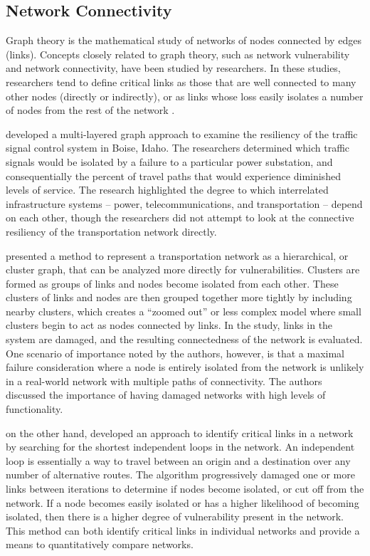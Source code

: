 \subsection{Network Connectivity}

Graph theory is the mathematical study of networks of nodes connected by
edges (links). Concepts closely related to graph theory, such as network
vulnerability and network connectivity, have been studied by researchers.
In these studies, researchers tend to define
critical links as those
that are well connected to many other nodes (directly or indirectly), or as links
whose loss easily isolates a
number of nodes from the rest of the network \citep{west2001}.

\citet{abdel2007} developed a multi-layered graph approach to examine the resiliency
of the traffic
signal control system in Boise, Idaho. The researchers determined which
traffic signals would be isolated by a failure to a particular power
substation,
and consequentially the percent of travel paths that would experience
diminished
levels of service. The research highlighted the degree to which interrelated
infrastructure systems -- power, telecommunications, and transportation --
depend on each other, though the researchers did not attempt to look at the
connective resiliency of the transportation network directly.

\citet{agarwal2011} presented a method to represent a transportation network
as a
hierarchical, or cluster graph, that can be analyzed more directly for
vulnerabilities. Clusters are formed as groups of links and nodes become
isolated from each other. These clusters of links and nodes are then grouped
together more tightly by including nearby clusters, which creates a
``zoomed out'' or less complex model where small clusters begin to act as nodes connected by links.
In the study, links in the system are damaged, and the resulting
connectedness of the network is evaluated. One scenario of importance
noted by the authors, however, is that a maximal failure consideration where a
node
is entirely isolated from the network is unlikely in a real-world network
with
multiple paths of connectivity. The authors discussed the importance of
having damaged networks with high levels of functionality.

\citet{vodak2019}
on the other hand, developed an approach to identify
critical links in a network by searching for the shortest independent
loops in the network. An independent loop is essentially a way to travel
between an origin and a destination over any number of alternative routes.
The algorithm progressively damaged one or more links
between iterations to determine if nodes become isolated, or cut off from
the
network. If a node becomes easily isolated or has a higher likelihood of
becoming isolated, then there is a higher degree of vulnerability present
in the
network. This method can both identify critical links in individual
networks and provide a means to quantitatively compare networks.

